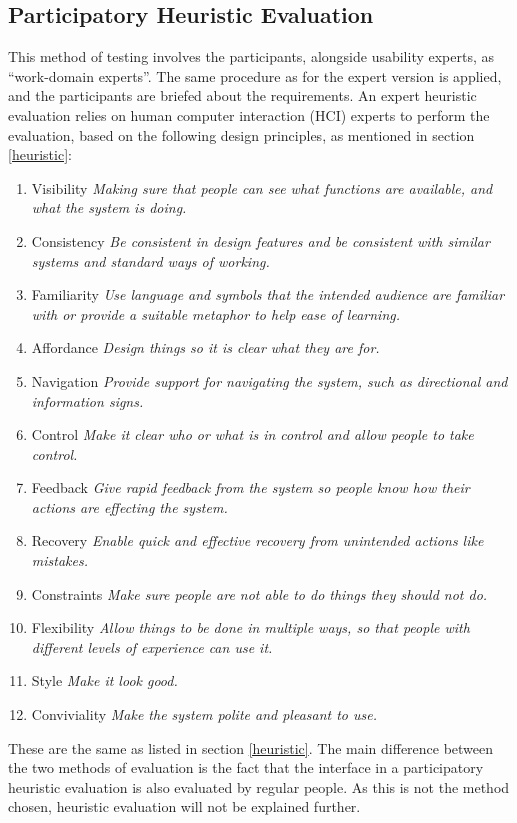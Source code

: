 \subsection{Participatory Heuristic Evaluation}
This method of testing involves the participants, alongside usability experts, as ``work-domain experts''. The same procedure as for the expert version is applied, and the participants are briefed about the requirements. An expert heuristic evaluation relies on human computer interaction (HCI) experts to perform the evaluation, based on the following design principles, as mentioned in section \ref{heuristic}:
\begin{enumerate}
	\item Visibility \textit{Making sure that people can see what functions are available, and what the system is doing.}
	\item Consistency \textit{Be consistent in design features and be consistent with similar systems and standard ways of working.}
	\item Familiarity \textit{Use language and symbols that the intended audience are familiar with or provide a suitable metaphor to help ease of learning.}
	\item Affordance \textit{Design things so it is clear what they are for.}
	\item Navigation \textit{Provide support for navigating the system, such as directional and information signs.}
	\item Control \textit{Make it clear who or what is in control and allow people to take control.}
	\item Feedback \textit{Give rapid feedback from the system so people know how their actions are effecting the system.}
	\item Recovery \textit{Enable quick and effective recovery from unintended actions like mistakes.}
	\item Constraints \textit{Make sure people are not able to do things they should not do.}
	\item Flexibility \textit{Allow things to be done in multiple ways, so that people with different levels of experience can use it.}
	\item Style \textit{Make it look good.}
	\item Conviviality \textit{Make the system polite and pleasant to use.}
\end{enumerate}
These are the same as listed in section \ref{heuristic}. The main difference between the two methods of evaluation is the fact that the interface in a participatory heuristic evaluation is also evaluated by regular people. As this is not the method
chosen, heuristic evaluation will not be explained further.